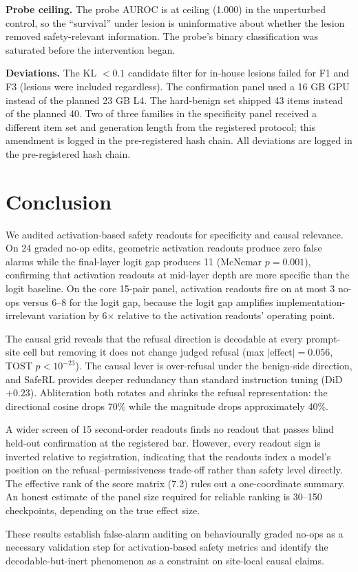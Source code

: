 \documentclass[11pt,letterpaper]{article}
\begin{document}
\textbf{Probe ceiling.} The probe AUROC is at ceiling (1.000) in the unperturbed control, so the ``survival'' under lesion is uninformative about whether the lesion removed safety-relevant information. The probe's binary classification was saturated before the intervention began.

\textbf{Deviations.} The KL $< 0.1$ candidate filter for in-house lesions failed for F1 and F3 (lesions were included regardless). The confirmation panel used a 16 GB GPU instead of the planned 23 GB L4. The hard-benign set shipped 43 items instead of the planned 40. Two of three families in the specificity panel received a different item set and generation length from the registered protocol; this amendment is logged in the pre-registered hash chain. All deviations are logged in the pre-registered hash chain.


\section{Conclusion}
\label{sec:conclusion}

We audited activation-based safety readouts for specificity and causal relevance. On 24 graded no-op edits, geometric activation readouts produce zero false alarms while the final-layer logit gap produces 11 (McNemar $p = 0.001$), confirming that activation readouts at mid-layer depth are more specific than the logit baseline. On the core 15-pair panel, activation readouts fire on at most 3 no-ops versus 6--8 for the logit gap, because the logit gap amplifies implementation-irrelevant variation by 6$\times$ relative to the activation readouts' operating point.

The causal grid reveals that the refusal direction is decodable at every prompt-site cell but removing it does not change judged refusal (max $|\text{effect}| = 0.056$, TOST $p < 10^{-23}$). The causal lever is over-refusal under the benign-side direction, and SafeRL provides deeper redundancy than standard instruction tuning (DiD $+0.23$). Abliteration both rotates and shrinks the refusal representation: the directional cosine drops 70\% while the magnitude drops approximately 40\%.

A wider screen of 15 second-order readouts finds no readout that passes blind held-out confirmation at the registered bar. However, every readout sign is inverted relative to registration, indicating that the readouts index a model's position on the refusal--permissiveness trade-off rather than safety level directly. The effective rank of the score matrix (7.2) rules out a one-coordinate summary. An honest estimate of the panel size required for reliable ranking is 30--150 checkpoints, depending on the true effect size.

These results establish false-alarm auditing on behaviourally graded no-ops as a necessary validation step for activation-based safety metrics and identify the decodable-but-inert phenomenon as a constraint on site-local causal claims.



\end{document}
